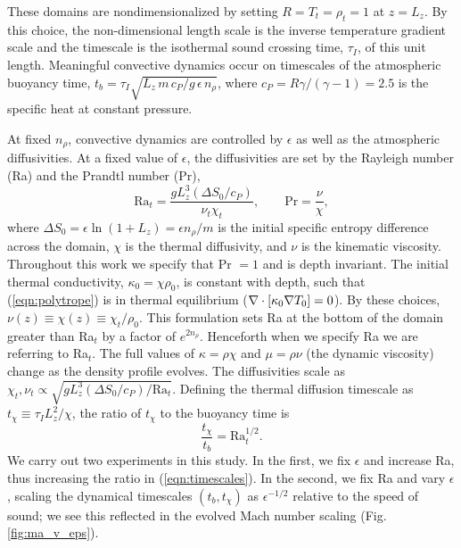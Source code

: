 These domains are nondimensionalized by setting $R = T_t = \rho_t = 1$ at $z = L_z$.
By this choice, the non-dimensional length scale is the inverse temperature gradient scale and the timescale is the isothermal sound crossing time, $\tau_I$, of this unit length.
Meaningful convective dynamics occur on timescales of the atmospheric buoyancy time, $t_b = \tau_I \sqrt{L_z\,m\,c_P/g\,\epsilon\,n_\rho}$, where $c_P = R \gamma/(\gamma-1) = 2.5$ is the specific heat at constant pressure.

At fixed $n_\rho$, convective dynamics are controlled by $\epsilon$ as well as the atmospheric diffusivities.
At a fixed value of $\epsilon$, the diffusivities are set by the Rayleigh number (Ra) and the Prandtl number (Pr),
\begin{equation}
\text{Ra}_{t} = \frac{g L_z^3 (\Delta S_0 / c_P)}{\nu_t\chi_t},
\qquad
\text{Pr} = \frac{\nu}{\chi},
\end{equation}
where $\Delta S_0 = \epsilon\ln (1 + L_z) = \epsilon n_\rho / m$ is the initial specific entropy difference across the domain, $\chi$ is the thermal diffusivity, and $\nu$ is the kinematic viscosity.
Throughout this work we specify that Pr $= 1$ and is depth invariant.
The initial thermal conductivity, $\kappa_0 = \chi \rho_0$, is constant with depth, such that (\ref{eqn:polytrope}) is in thermal equilibrium ($\nabla\cdot[\kappa_0\nabla T_0] = 0$).
By these choices, $\nu(z) \equiv \chi(z) \equiv \chi_t / \rho_0$.
This formulation sets Ra at the bottom of the domain greater than Ra$_t$ by a factor of $e^{2n_\rho}$. 
Henceforth when we specify Ra we are referring to Ra$_t$.  
The full values of $\kappa = \rho\chi$ and $\mu = \rho\nu$ (the dynamic viscosity) change as the density profile evolves.  
The diffusivities scale as $\chi_t, \nu_t \propto \sqrt{g L_z^3 (\Delta S_0 / c_P) / \text{Ra}_t}$.
Defining the thermal diffusion timescale as $t_\chi \equiv \tau_IL_z^2 / \chi$, the ratio of $t_\chi$ to the buoyancy time is
\begin{equation}
\frac{t_\chi}{t_b} =\text{Ra}_t^{1/2}.
\label{eqn:timescales}
\end{equation}
We carry out two experiments in this study. 
In the first, we fix $\epsilon$ and increase Ra, thus increasing the ratio in (\ref{eqn:timescales}). 
In the second, we fix Ra and vary $\epsilon$, scaling the dynamical timescales $(t_b, t_\chi)$ as $\epsilon^{-1/2}$ relative to the speed of sound; we see this reflected in the evolved Mach number scaling (Fig. \ref{fig:ma_v_eps}).


